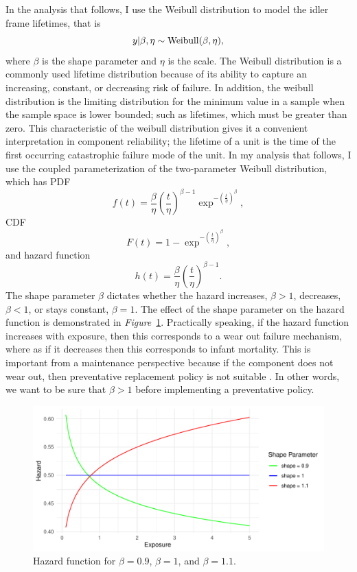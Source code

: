 In the analysis that follows, I use the Weibull distribution to model the idler frame lifetimes, that is
\begin{equation}
    y|\beta, \eta \sim \hbox{Weibull}(\beta, \eta),
\end{equation}
where $\beta$ is the shape parameter and $\eta$ is the scale. The Weibull distribution is a commonly used lifetime distribution because of its ability to capture an increasing, constant, or decreasing risk of failure. In addition, the weibull distribution is the limiting distribution for the minimum value in a sample when the sample space is lower bounded; such as lifetimes, which must be greater than zero. This characteristic of the weibull distribution gives it a convenient interpretation in component reliability; the lifetime of a unit is the time of the first occurring catastrophic failure mode of the unit. In my analysis that follows, I use the coupled parameterization of the two-parameter Weibull distribution, which has PDF
\begin{equation}
    f(t) = \frac{\beta}{\eta}\left(\frac{t}{\eta}\right)^{\beta - 1} \exp^{-\left(\frac{t}{\eta}\right)^{\beta}},
\end{equation}
CDF
\begin{equation}
    F(t) = 1 - \exp^{-\left(\frac{t}{\eta}\right)^{\beta}},
\end{equation}
and hazard function
\begin{equation}
    h(t) = \frac{\beta}{\eta}\left(\frac{t}{\eta}\right)^{\beta - 1}.
\end{equation}
The shape parameter $\beta$ dictates whether the hazard increases, $\beta > 1$, decreases, $\beta < 1$, or stays constant, $\beta = 1$. The effect of the shape parameter on the hazard function is demonstrated in \textit{Figure}~\ref{fig:hazard_function_demo}. Practically speaking, if the hazard function increases with exposure, then this corresponds to a wear out failure mechanism, where as if it decreases then this corresponds to infant mortality. This is important from a maintenance perspective because if the component does not wear out, then preventative replacement policy is not suitable \citep{jardine2013}. In other words, we want to be sure that $\beta > 1$ before implementing a preventative policy.

\begin{figure}[h]
    \centering
    \includegraphics[width=1\textwidth]{./figures/hazard_func_demo.pdf}
    \caption{Hazard function for $\beta = 0.9$, $\beta = 1$, and $\beta = 1.1$.}
    \label{fig:hazard_function_demo}
\end{figure}


